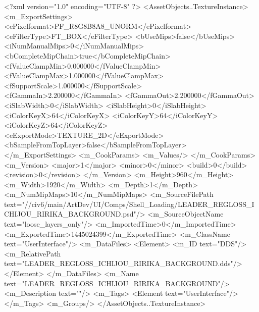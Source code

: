 <?xml version="1.0" encoding="UTF-8" ?>
<AssetObjects..TextureInstance>
	<m_ExportSettings>
		<ePixelformat>PF_R8G8B8A8_UNORM</ePixelformat>
		<eFilterType>FT_BOX</eFilterType>
		<bUseMips>false</bUseMips>
		<iNumManualMips>0</iNumManualMips>
		<bCompleteMipChain>true</bCompleteMipChain>
		<fValueClampMin>0.000000</fValueClampMin>
		<fValueClampMax>1.000000</fValueClampMax>
		<fSupportScale>1.000000</fSupportScale>
		<fGammaIn>2.200000</fGammaIn>
		<fGammaOut>2.200000</fGammaOut>
		<iSlabWidth>0</iSlabWidth>
		<iSlabHeight>0</iSlabHeight>
		<iColorKeyX>64</iColorKeyX>
		<iColorKeyY>64</iColorKeyY>
		<iColorKeyZ>64</iColorKeyZ>
		<eExportMode>TEXTURE_2D</eExportMode>
		<bSampleFromTopLayer>false</bSampleFromTopLayer>
	</m_ExportSettings>
	<m_CookParams>
		<m_Values/>
	</m_CookParams>
	<m_Version>
		<major>1</major>
		<minor>0</minor>
		<build>0</build>
		<revision>0</revision>
	</m_Version>
	<m_Height>960</m_Height>
	<m_Width>1920</m_Width>
	<m_Depth>1</m_Depth>
	<m_NumMipMaps>10</m_NumMipMaps>
	<m_SourceFilePath text="//civ6/main/ArtDev/UI/Comps/Shell_Loading/LEADER_REGLOSS_ICHIJOU_RIRIKA_BACKGROUND.psd"/>
	<m_SourceObjectName text="loose_layers_only"/>
	<m_ImportedTime>0</m_ImportedTime>
	<m_ExportedTime>1445024399</m_ExportedTime>
	<m_ClassName text="UserInterface"/>
	<m_DataFiles>
		<Element>
			<m_ID text="DDS"/>
			<m_RelativePath text="LEADER_REGLOSS_ICHIJOU_RIRIKA_BACKGROUND.dds"/>
		</Element>
	</m_DataFiles>
	<m_Name text="LEADER_REGLOSS_ICHIJOU_RIRIKA_BACKGROUND"/>
	<m_Description text=""/>
	<m_Tags>
		<Element text="UserInterface"/>
	</m_Tags>
	<m_Groups/>
</AssetObjects..TextureInstance>

